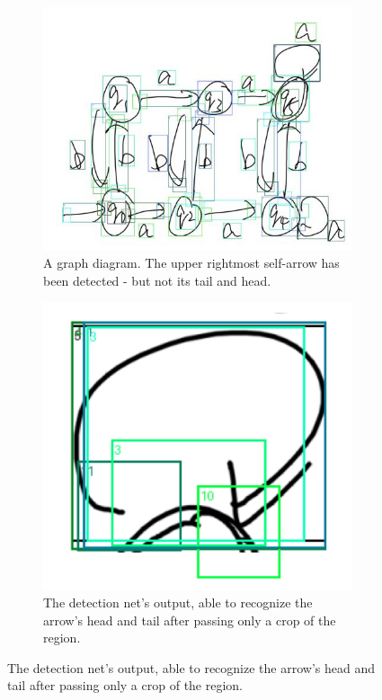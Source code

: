 \documentclass[conference]{IEEEtran}
\begin{document}
\begin{figure}[htbp]
	\centering
	
	\begin{subfigure}[b]{0.45\linewidth}
		\includegraphics[width=\linewidth]{retrieval1.jpg}
		\caption{A graph diagram. The upper rightmost self-arrow has been detected - but not its tail and head.}
	\end{subfigure}
	\hfill
	\begin{subfigure}[b]{0.45\linewidth}
		\includegraphics[width=\linewidth]{retrieval2.png}
		\caption{The detection net's output, able to recognize the arrow's head and tail after passing only a crop of the region.}
	\end{subfigure}
	
\end{figure}
\end{document}
